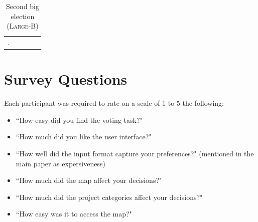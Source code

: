 \documentclass{comsoc2023}
\begin{document}
\begin{longtable}[ht!]{|p{2cm}|p{6cm}|p{3cm}|p{1cm}|p{2.5cm}|}
     \hline
  \caption{Second big election (\textsc{Large-B})}\label{tab:fourth_elc}.
\end{longtable}


\section{Survey Questions}\label{app:survey}
Each participant was required to rate on a scale of 1 to 5 the following:

\begin{itemize}
    \item ``How easy did you find the voting task?"
    \item ``How much did you like the user interface?"
    \item ``How well did the input format capture your preferences?" (mentioned in the main paper as expersiveness)
    \item ``How much did the map affect your decisions?"
    \item ``How much did the project categories affect your decisions?"
    \item ``How easy was it to access the map?"
\end{itemize}
\end{document}
